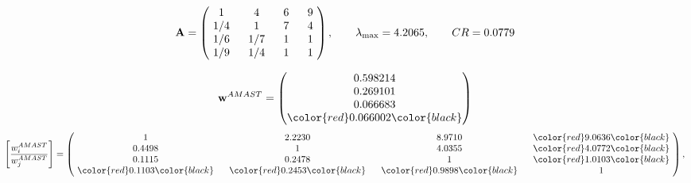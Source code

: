\begin{example}
\begin{equation*}
\mathbf{A} =
\begin{pmatrix}
$\,\,$ 1 $\,\,$ & $\,\,$4$\,\,$ & $\,\,$6$\,\,$ & $\,\,$9 $\,\,$ \\
$\,\,$ 1/4$\,\,$ & $\,\,$ 1 $\,\,$ & $\,\,$7$\,\,$ & $\,\,$4 $\,\,$ \\
$\,\,$ 1/6$\,\,$ & $\,\,$ 1/7$\,\,$ & $\,\,$ 1 $\,\,$ & $\,\,$1 $\,\,$ \\
$\,\,$ 1/9$\,\,$ & $\,\,$ 1/4$\,\,$ & $\,\,$ 1 $\,\,$ & $\,\,$ 1  $\,\,$ \\
\end{pmatrix},
\qquad
\lambda_{\max} =
4.2065,
\qquad
CR = 0.0779
\end{equation*}

\begin{equation*}
\mathbf{w}^{AMAST} =
\begin{pmatrix}
0.598214\\
0.269101\\
0.066683\\
\color{red} 0.066002\color{black}
\end{pmatrix}\end{equation*}
\begin{equation*}
\left[ \frac{{w}^{AMAST}_i}{{w}^{AMAST}_j} \right] =
\begin{pmatrix}
$\,\,$ 1 $\,\,$ & $\,\,$2.2230$\,\,$ & $\,\,$8.9710$\,\,$ & $\,\,$\color{red} 9.0636\color{black} $\,\,$ \\
$\,\,$0.4498$\,\,$ & $\,\,$ 1 $\,\,$ & $\,\,$4.0355$\,\,$ & $\,\,$\color{red} 4.0772\color{black}   $\,\,$ \\
$\,\,$0.1115$\,\,$ & $\,\,$0.2478$\,\,$ & $\,\,$ 1 $\,\,$ & $\,\,$\color{red} 1.0103\color{black}  $\,\,$ \\
$\,\,$\color{red} 0.1103\color{black} $\,\,$ & $\,\,$\color{red} 0.2453\color{black} $\,\,$ & $\,\,$\color{red} 0.9898\color{black} $\,\,$ & $\,\,$ 1  $\,\,$ \\
\end{pmatrix},
\end{equation*}


\end{example}
